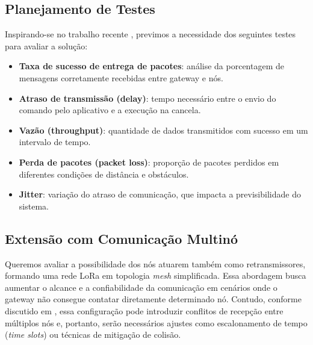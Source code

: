 \documentclass[
article,			%
11pt,				%
twoside,			%
a4paper,			%
section=TITLE,		%
onecolumn,          %
english,			%
brazil,				%
sumario=tradicional
]{abntex2}
\begin{document}
    \subsection{Planejamento de Testes}
    Inspirando-se no trabalho recente \cite{rahmatullah2025}, previmos a necessidade dos seguintes testes para avaliar a solução:

    \begin{itemize}
        \item \textbf{Taxa de sucesso de entrega de pacotes}: análise da porcentagem de mensagens corretamente recebidas entre gateway e nós.
        \item \textbf{Atraso de transmissão (delay)}: tempo necessário entre o envio do comando pelo aplicativo e a execução na cancela.
        \item \textbf{Vazão (throughput)}: quantidade de dados transmitidos com sucesso em um intervalo de tempo.
        \item \textbf{Perda de pacotes (packet loss)}: proporção de pacotes perdidos em diferentes condições de distância e obstáculos.
        \item \textbf{Jitter}: variação do atraso de comunicação, que impacta a previsibilidade do sistema.
    \end{itemize}
    
    \subsection{Extensão com Comunicação Multinó}
    Queremos avaliar a possibilidade dos nós atuarem também como retransmissores, formando uma rede LoRa em topologia \textit{mesh} simplificada. Essa abordagem busca aumentar o alcance e a confiabilidade da comunicação em cenários onde o gateway não consegue contatar diretamente determinado nó. Contudo, conforme discutido em \cite{huh2019} \cite{rahmatullah2025}, essa configuração pode introduzir conflitos de recepção entre múltiplos nós e, portanto, serão necessários ajustes como escalonamento de tempo (\textit{time slots}) ou técnicas de mitigação de colisão.

\end{document}
